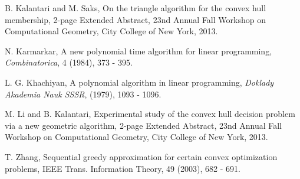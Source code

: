 \documentclass{article}
\theoremstyle{definition}
\begin{document}
\begin{thebibliography}{9}
 B. Kalantari and M. Saks, On the triangle algorithm for the convex hull membership, 2-page Extended Abstract, 23nd Annual Fall Workshop on Computational Geometry, City College of New York, 2013.  \filbreak

 N. Karmarkar,  A new polynomial time algorithm for linear programming, {\it Combinatorica}, 4 (1984),  373 - 395. \filbreak


 L. G. Khachiyan, A polynomial algorithm in linear programming, {\it Doklady Akademia Nauk SSSR},
(1979), 1093 - 1096.\filbreak


 M. Li and B. Kalantari, Experimental study of the convex hull decision problem via a new geometric algorithm, 2-page Extended Abstract, 23nd Annual Fall Workshop on Computational Geometry, City College of New York, 2013. \filbreak

   T. Zhang, Sequential greedy approximation for certain convex optimization problems, IEEE Trans. Information Theory, 49 (2003), 682 - 691. \filbreak

\end{thebibliography}

\bigskip
\end{document}
